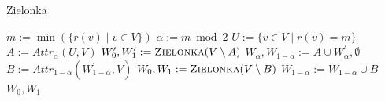 \documentclass{article}
\newcommand{\attrsym}{\ensuremath{\textit{Attr}}}
\newcommand{\attr}[3][]{\ensuremath{\attrsym^{#1}_{#2}(#3)}}
\begin{document}
\begin{algorithm}[h]
\caption{Zielonka}
\label{alg:zielonka}
\begin{algorithmic}[1]
  \State \Return {$\emptyset, \emptyset$}
\EndIf
\State $m:=\min (\{r(v)\mid v\in V\})$ 
\State $\alpha := m \bmod 2$
\State $U:=\{v\in V\mid r(v)=m\}$ 
\State $A := \attr{\alpha}{U,V}$
\State $W_{0}^{\prime },W_{1}^{\prime}:= \textsc{Zielonka}(V\setminus A)$
  \State $W_{\alpha },W_{1-\alpha }:=A\cup W_{\alpha }^{\prime},\emptyset$ 
\Else
  \State $B := \attr{1-\alpha}{W_{1-\alpha }^{\prime }, V}$
  \State $W_{0},W_{1}:=\textsc{Zielonka}(V\setminus B)$ 
  \State $W_{1-\alpha } := W_{1-\alpha }\cup B$ 
\EndIf
\State \Return $W_{0},W_{1}$
\EndFunction
\end{algorithmic}
\end{algorithm}

\newpage


\end{document}
